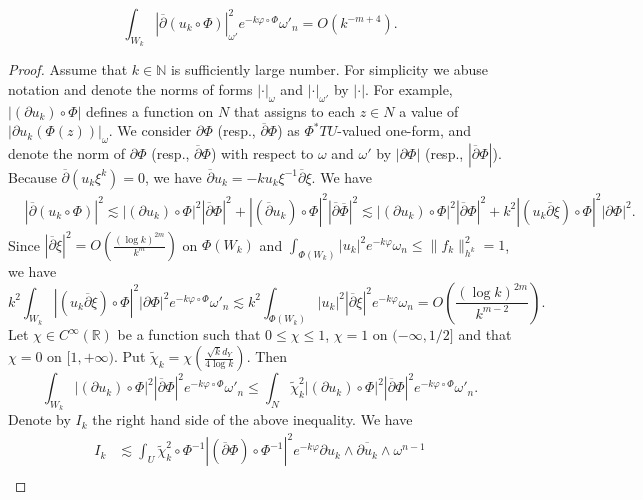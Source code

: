 \documentclass[10pt,a4paper]{amsart}
\begin{document}
\begin{lemma}\label{lemma:4}
\[
\int_{W_{k}} |\overline{\partial}(u_{k}\circ\Phi)|^2_{\omega'} e^{-k\varphi \circ \Phi}\omega'_{n} = O(k^{-m+4}).  
\]
\end{lemma}

\begin{proof}
Assume that $k \in \mathbb{N}$ is sufficiently large number.  
For simplicity we abuse notation and denote the norms of forms $|\cdot |_{\omega}$ and $|\cdot|_{\omega'}$ by $|\cdot|$.  
For example, $|(\partial u_k) \circ \Phi|$ defines a function on $N$ that assigns to each $z \in N$ a value of $|\partial u_k (\Phi(z))|_{\omega}$.  
%
We consider $\partial \Phi$ (resp., $\overline{\partial}\Phi$) as $\Phi^{*}TU$-valued one-form, and denote 
the norm of $\partial \Phi$ (resp., $\overline{\partial} \Phi$) with respect to $\omega$ and $\omega'$ by $|\partial \Phi|$ (resp., $|\overline{\partial} \Phi|$).  
Because $\overline{\partial}(u_{k}\xi^k) = 0$, we have $\overline{\partial}u_{k} = -ku_{k}\xi^{-1}\overline{\partial} \xi$.  
We have 
\begin{align*}
& |\overline{\partial} (u_{k} \circ \Phi)|^2 
\lesssim | (\partial u_{k}) \circ \Phi|^2 |\overline{\partial}\Phi|^2 + |(\overline{\partial} u_{k}) \circ \Phi|^2  |\overline{\partial} \overline{\Phi}|^2 
\lesssim | (\partial u_{k})\circ \Phi|^2 |\overline{\partial}\Phi|^2 + k^2 |(u_{k}\overline{\partial}\xi)\circ \Phi|^2 |\partial \Phi|^2.  
\end{align*}
Since $|\overline{\partial} \xi|^2= O(\frac{(\log k)^{2m}}{k^{m}})$ on $\Phi(W_{k})$ and $\int_{\Phi(W_k)}|u_k|^2e^{-k\varphi} \omega_n \leq \|f_{k}\|^2_{h^k} = 1$, we have 
\[
k^2 \int_{W_{k}} |(u_{k} \overline{\partial}\xi)\circ \Phi|^2 |\partial \Phi|^2 e^{-k\varphi \circ \Phi} \omega'_{n} 
\lesssim 
k^2 \int_{\Phi(W_{k})} |u_{k}|^2 |\overline{\partial}\xi|^2 e^{-k\varphi} \omega_{n} 
= 
O(\frac{ (\log k)^{2m}}{k^{m-2}}).  
\]
Let $\chi \in C^{\infty}(\mathbb{R})$ be a function such that $0 \leq \chi \leq 1$, $\chi = 1$ on $(-\infty, 1/2]$ and that $\chi = 0$ on $[1, +\infty)$.  
Put $\tilde{\chi}_{k} = \chi (\frac{\sqrt{k}d_{Y}}{4\log k})$.  
Then 
\[
\int_{W_{k}} |(\partial u_{k})\circ \Phi|^2 |\overline{\partial} \Phi|^2 e^{-k\varphi \circ \Phi} \omega'_{n} \leq \int_{N}\tilde{\chi}^2_{k} |(\partial u_{k})\circ \Phi|^2 |\overline{\partial} \Phi|^2 e^{-k\varphi \circ \Phi} \omega'_{n}.  
\]
Denote by $I_{k}$ the right hand side of the above inequality.  
We have 
\begin{align*}
I_{k} & \lesssim \int_{U} \tilde{\chi}^2_{k}\circ \Phi^{-1} |(\overline{\partial} \Phi)\circ \Phi^{-1}|^2 e^{-k \varphi} \partial u_{k} \wedge \overline{\partial u_{k}} \wedge \omega^{n-1} \\

\end{align*}
\end{proof}
\end{document}
